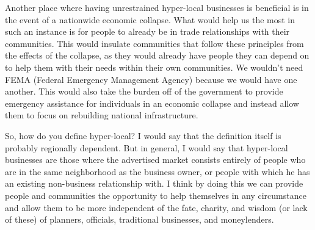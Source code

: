 Another place where having unrestrained hyper-local businesses is
beneficial is in the event of a nationwide economic collapse. What
would help us the
most in such an
instance is for people to already be in trade relationships with their
communities.  This
would insulate
communities that follow these principles from the effects
of the collapse, as
they would already
have people they can depend on
to help them with
their needs within their own communities. We
wouldn’t need FEMA
(Federal Emergency Management Agency) because we
would have one
another. This would
also take the burden off of the government to provide emergency
assistance for individuals in an economic collapse and instead allow
them to focus on rebuilding national
infrastructure.


So, how do you define hyper-local?  I would say that the definition
itself is probably regionally dependent. But in general, I would say
that hyper-local
businesses are those
where the advertised market consists entirely of people who are in the
same neighborhood as the business owner, or people with which he has an
existing non-business relationship with. I think by doing this we can
provide people and communities the opportunity to help themselves in
any circumstance and allow them to be more independent of the fate,
charity, and wisdom (or lack of these) of planners, officials,
traditional businesses, and moneylenders.
